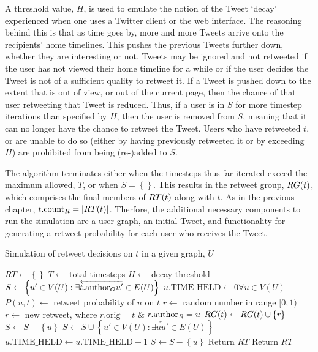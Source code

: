 A threshold value, $H$, is used to emulate the notion of the Tweet `decay' experienced when one uses a Twitter client or the web interface. The reasoning behind this is that as time goes by, more and more Tweets arrive onto the recipients' home timelines. This pushes the previous Tweets further down, whether they are interesting or not. Tweets may be ignored and not retweeted if the user has not viewed their home timeline for a while or if the user decides the Tweet is not of a sufficient quality to retweet it. If a Tweet is pushed down to the extent that is out of view, or out of the current page, then the chance of that user retweeting that Tweet is reduced. Thus, if a user is in $S$ for more timestep iterations than specified by $H$, then the user is removed from $S$, meaning that it can no longer have the chance to retweet the Tweet. Users who have retweeted $t$, or are unable to do so (either by having previously retweeted it or by exceeding $H$) are prohibited from being (re-)added to $S$.

The algorithm terminates either when the timesteps thus far iterated exceed the maximum allowed, $T$, or when $S = \left\{\right\}$. This results in the retweet group, $RG(t)$, which comprises the final members of $RT(t)$ along with $t$. As in the previous chapter, $t.\textrm{count}_R = |RT(t)|$. Therfore, the additional necessary components to run the simulation are a user graph, an initial Tweet, and functionality for generating a retweet probability for each user who receives the Tweet.

\begin{algorithm}
\caption{Simulation of retweet decisions on $t$ in a given graph, $U$}
\begin{algorithmic}[1]
    \State $RT\gets \left\{\right\}$
    \State $T\gets$ total timesteps
    \State $H\gets$ decay threshold 
    \State $S\gets \left\{u' \in V(U) : \exists \overleftarrow{t.\textrm{author}_O u'} \in E(U)\right\}$
    \State $u.\textrm{TIME\_HELD}\gets 0 \forall u \in V(U)$
    \Statex %
            \State $P(u,t)\gets$ retweet probability of $u$ on $t$
            \State $r\gets$ random number in range $[0,1)$
                \State $r\gets$ new retweet, where $r.\textrm{orig} = t$ \& $r.\textrm{author}_R = u$
                \State $RG(t)\gets RG(t) \cup \left\{r\right\}$
                \State $S\gets S - \left\{u\right\}$
                \State $S\gets S \cup \left\{u' \in V(U) : \exists \overleftarrow{u u'} \in E(U)\right\}$
            \Else
                \State $u.\textrm{TIME\_HELD}\gets u.\textrm{TIME\_HELD} + 1$
                    \State $S\gets S - \left\{u\right\}$ 
                \EndIf
            \EndIf
        \EndFor
            \State Return $RT$ 
        \EndIf
    \EndFor
    \State Return $RT$
\EndProcedure
\end{algorithmic}
\label{algo1}
\end{algorithm}



